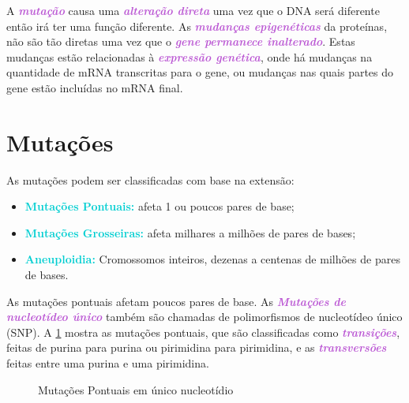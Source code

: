 \documentclass[11pt,a4paper]{article}
\begin{document}
	A \textcolor{MediumOrchid}{\textbf{\textit{mutação}}} causa uma \textcolor{MediumOrchid}{\textbf{\textit{alteração direta}}} uma vez que o DNA será diferente então irá ter uma função diferente. As\textcolor{MediumOrchid}{\textbf{\textit{ mudanças epigenéticas}}} da proteínas, não são tão diretas uma vez que o \textcolor{MediumOrchid}{\textbf{\textit{gene permanece inalterado}}}. Estas mudanças estão relacionadas à \textcolor{MediumOrchid}{\textbf{\textit{expressão genética}}}, onde há mudanças na quantidade de mRNA transcritas para o gene, ou mudanças nas quais partes do gene estão incluídas no mRNA final.

\section{Mutações}

	As mutações podem ser classificadas com base na extensão:

	\begin{itemize}
		\item \textcolor{DarkTurquoise}{\textbf{Mutações Pontuais:}} afeta 1 ou poucos pares de base;
		\item \textcolor{DarkTurquoise}{\textbf{Mutações Grosseiras:}} afeta milhares a milhões de pares de bases;
		\item \textcolor{DarkTurquoise}{\textbf{Aneuploidia:}} Cromossomos inteiros, dezenas a centenas de milhões de pares de bases.
	\end{itemize}	

	As mutações pontuais afetam poucos pares de base. As \textcolor{MediumOrchid}{\textbf{\textit{Mutações de nucleotídeo único}}} também são chamadas de polimorfismos de nucleotídeo único (SNP). A \ref{fig:mutacoesPontuais1} mostra as mutações pontuais, que são classificadas como \textcolor{MediumOrchid}{\textbf{\textit{transições}}}, feitas de purina para purina ou pirimidina para pirimidina, e as \textcolor{MediumOrchid}{\textbf{\textit{transversões}}} feitas entre uma purina e uma pirimidina. 
		
		\begin{figure}[h]
			\centering
			\caption{Mutações Pontuais em único nucleotídio}
			\label{fig:mutacoesPontuais1}
		\end{figure}
		
\end{document}

